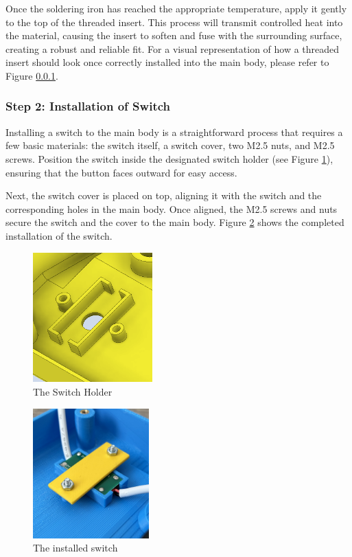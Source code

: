 Once the soldering iron has reached the appropriate temperature, apply it gently to the top of the threaded insert. This process will transmit controlled heat into the material, causing the insert to soften and fuse with the surrounding surface, creating a robust and reliable fit. For a visual representation of how a threaded insert should look once correctly installed into the main body, please refer to Figure \ref{}.

\subsubsection{Step 2: Installation of Switch}
Installing a switch to the main body is a straightforward process that requires a few basic materials: the switch itself, a switch cover, two M2.5 nuts, and M2.5 screws. Position the switch inside the designated switch holder (see Figure \ref{fig:switchholder}), ensuring that the button faces outward for easy access.

Next, the switch cover is placed on top, aligning it with the switch and the corresponding holes in the main body. Once aligned, the M2.5 screws and nuts secure the switch and the cover to the main body. Figure \ref{fig:switchinstall} shows the completed installation of the switch.

\begin{figure}
    \centering
    \includegraphics[height=5cm]{texs/Part1/chapter5/image/switchhole.png}
    \caption{The Switch Holder}
    \label{fig:switchholder}
\end{figure}

\begin{figure}
    \centering
    \includegraphics[height=5cm]{texs/Part1/chapter5/image/switchinstall.jpg}
    \caption{The installed switch}
    \label{fig:switchinstall}
\end{figure}

